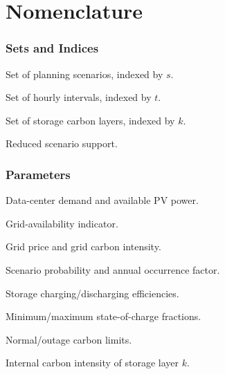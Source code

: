 \documentclass[times]{elsarticle}
\newenvironment{manuscriptdescription}
  {\begin{description}[style=multiline,leftmargin=4.8cm,labelwidth=4.5cm,align=left]}
  {\end{description}}
\begin{document}
\section*{Nomenclature}

\subsubsection*{Sets and Indices}
\begin{manuscriptdescription}
\item[$\mathcal{S}$] Set of planning scenarios, indexed by $s$.
\item[$\mathcal{T}$] Set of hourly intervals, indexed by $t$.
\item[$\mathcal{K}_s$] Set of storage carbon layers, indexed by $k$.
\item[$\widehat{\mathcal{S}}$] Reduced scenario support.
\end{manuscriptdescription}

\subsubsection*{Parameters}
\begin{manuscriptdescription}
\item[$D_{s,t},V_{s,t}$] Data-center demand and available PV power.
\item[$a_{s,t}$] Grid-availability indicator.
\item[$p_{s,t},c_{s,t}$] Grid price and grid carbon intensity.
\item[$\pi_s,\rho_s$] Scenario probability and annual occurrence factor.
\item[$\eta^{\mathrm{ch}},\eta^{\mathrm{dc}}$] Storage charging/discharging efficiencies.
\item[$\underline\sigma,\overline\sigma$] Minimum/maximum state-of-charge fractions.
\item[$\bar c^{\mathrm n},\bar c^{\mathrm o}$] Normal/outage carbon limits.
\item[$\gamma_{s,k}$] Internal carbon intensity of storage layer $k$.
\end{manuscriptdescription}
\end{document}
